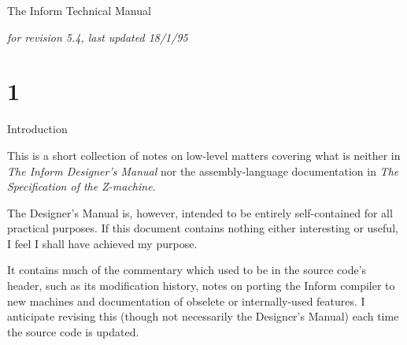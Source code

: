 
\def\poem{\begingroup\narrower\narrower\narrower\obeylines\ninepoint}
\def\widepoem{\begingroup\narrower\narrower\obeylines\ninepoint}
\def\verywidepoem{\begingroup\narrower\obeylines\ninepoint}
\def\quote{\medskip\begingroup\narrower\narrower\noindent\ninepoint}
\def\poemby#1#2{\par\smallskip\qquad\qquad\qquad\qquad\qquad -- #1, {\it #2}
\tenpoint\endgroup\bigskip}
\def\widepoemby#1#2{\par\smallskip\qquad\qquad\qquad -- #1, {\it #2}
\tenpoint\endgroup\bigskip}
\def\quoteby#1{\par\smallskip\qquad\qquad\qquad\qquad\qquad
 -- #1\tenpoint\endgroup\bigskip}
\def\endquote{\par\tenpoint\endgroup\medskip}

%
\def\subtitle#1{\bigbreak\noindent{\bf #1}\medskip}

\titletrue\tenpoint

\centerline{\bigfont The Inform Technical Manual}
\vskip 0.5in
\centerline{\sl for revision 5.4, last updated 18/1/95}
\vskip 0.5in 

\vfill\eject

\section{1}{Introduction}

This is a short collection of notes on low-level matters covering what
is neither in {\sl The Inform Designer's Manual} nor the assembly-language
documentation in {\sl The Specification of the Z-machine}.

The Designer's Manual is, however, intended to be entirely self-contained
for all practical purposes.  If this document contains nothing either
interesting or useful, I feel I shall have achieved my purpose.

It contains much of the commentary which used to be in the source code's
header, such as its modification history, notes on porting the Inform
compiler to new machines and documentation of obselete or internally-used
features.  I anticipate revising this (though not necessarily the
Designer's Manual) each time the source code is updated.

